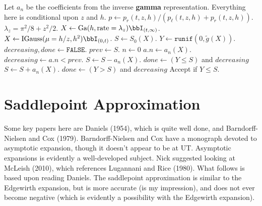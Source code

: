 \documentclass[12pt]{article}
\begin{document}
\begin{algorithm}
\begin{algorithmic}
\State Let $a_n$ be the coefficients from the inverse \textbf{gamma} representation.
\State Everything here is conditional upon $z$ and $h$.
\State $p \gets p_r(t,z,h) / (p_\ell(t,z,h) + p_r(t,z,h))$.
\State $\lambda_z = \pi^2 / 8 + z^2 / 2$.
  \State $X \gets \text{Ga}(h, \text{rate}=\lambda_z) \bbI_{(t,\infty)}$.
\Else
  \State $X \gets \text{IGauss}(\mu=h/z, h^2) \bbI_{(0,t)}$.
\EndIf
\State $S \gets S_0(X)$.
\State $Y \gets \texttt{runif}(0, \tilde g(X))$.
\State $decreasing, done \gets\texttt{FALSE}$.
\State $prev \gets S$.
\State $n \gets 0$
\State $a.n \gets a_n(X)$.
\State $decreasing \gets a.n < prev$.
  \State $S \gets S - a_n(X)$.
  \State $done \gets (Y \leq S)$ and $decreasing$
\Else %
  \State $S \gets S + a_n(X)$.
  \State $done \gets (Y > S)$ and $decreasing$
\EndIf
\EndWhile
\State Accept if $Y \leq S$.
\end{algorithmic}
\end{algorithm}

\section{Saddlepoint Approximation}

Some key papers here are Daniels (1954), which is quite well done, and
Barndorff-Nielsen and Cox (1979).  Barndorff-Nielsen and Cox have a monograph
devoted to asymptotic expansion, though it doesn't appear to be at UT.
Asymptotic expansions is evidently a well-developed subject.  Nick suggested
looking at McLeish (2010), which references Lugannani and Rice (1980).  What
follows is based upon reading Daniels.  The saddlepoint approximation is similar
to the Edgewirth expansion, but is more accurate (is my impression), and does
not ever become negative (which is evidently a possibility with the Edgewirth
expansion).
\end{document}
